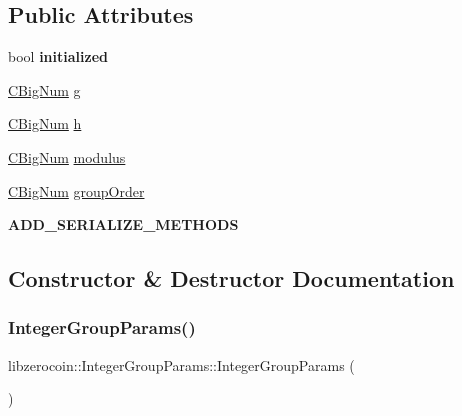 \subsection*{Public Attributes}
\begin{DoxyCompactItemize}
\item 
\mbox{\label{classlibzerocoin_1_1_integer_group_params_ab39d81c3f6a0270f44fc8571f8b5ad2a}} 
bool {\bfseries initialized}
\item 
\mbox{\hyperlink{class_c_big_num}{C\+Big\+Num}} \mbox{\hyperlink{classlibzerocoin_1_1_integer_group_params_a7ed998ff8bb39de1f52cc12c19d66112}{g}}
\item 
\mbox{\hyperlink{class_c_big_num}{C\+Big\+Num}} \mbox{\hyperlink{classlibzerocoin_1_1_integer_group_params_a23e945fc61cb016c144e22a1cc01e96a}{h}}
\item 
\mbox{\hyperlink{class_c_big_num}{C\+Big\+Num}} \mbox{\hyperlink{classlibzerocoin_1_1_integer_group_params_a2bf8badb9ba3a76672fa10e375fde097}{modulus}}
\item 
\mbox{\hyperlink{class_c_big_num}{C\+Big\+Num}} \mbox{\hyperlink{classlibzerocoin_1_1_integer_group_params_a08c2b09572927d5355cf570d4dc7e1cf}{group\+Order}}
\item 
\mbox{\label{classlibzerocoin_1_1_integer_group_params_abafb238a92ac1a6d109ab7ca54c0020c}} 
{\bfseries A\+D\+D\+\_\+\+S\+E\+R\+I\+A\+L\+I\+Z\+E\+\_\+\+M\+E\+T\+H\+O\+DS}
\end{DoxyCompactItemize}


\subsection{Constructor \& Destructor Documentation}
\mbox{\label{classlibzerocoin_1_1_integer_group_params_ae37d4d4e9c525069a15155e454d7f48e}} 
\subsubsection{\texorpdfstring{Integer\+Group\+Params()}{IntegerGroupParams()}}
{\footnotesize\ttfamily libzerocoin\+::\+Integer\+Group\+Params\+::\+Integer\+Group\+Params (\begin{DoxyParamCaption}{ }\end{DoxyParamCaption})}



